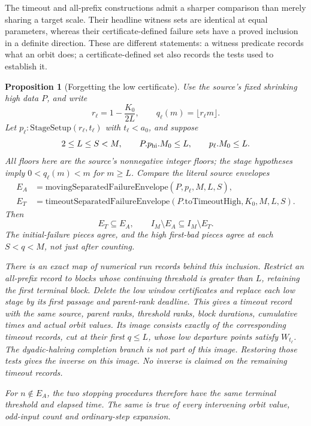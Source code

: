 \documentclass[11pt]{article}
\newtheorem{proposition}{Proposition}
\theoremstyle{remark}\newtheorem{remark}[proposition]{Remark}
\begin{document}
The timeout and all-prefix constructions admit a sharper comparison than
merely sharing a target scale. Their headline witness sets are identical
at equal parameters, whereas their certificate-defined failure sets have
a proved inclusion in a definite direction. These are different statements:
a witness predicate records what an orbit does; a certificate-defined set
also records the tests used to establish it.

\begin{proposition}[Forgetting the low certificate]
\label{prop:shaik-timeout-forgetting}
Use the source's fixed shrinking high data \(P\), and write
\[
 r_\ell=1-\frac{K_0}{2L},\qquad
 q_\ell(m)=\lfloor r_\ell m\rfloor .
\]
Let \(p_\ell:\mathrm{StageSetup}(r_\ell,t_\ell)\) with
\(t_\ell<a_0\), and suppose
\[
 2\le L\le S<M,\qquad
 P.p_{\rm hi}.M_0\le L,\qquad p_\ell.M_0\le L.
\]
All floors here are the source's nonnegative integer floors; the stage
hypotheses imply \(0<q_\ell(m)<m\) for \(m\ge L\).
Compare the literal source envelopes
\[
 \begin{aligned}
 E_A&=\mathrm{movingSeparatedFailureEnvelope}(P,p_\ell,M,L,S),\\
 E_T&=\mathrm{timeoutSeparatedFailureEnvelope}
                 (P.\mathrm{toTimeoutHigh},K_0,M,L,S).
 \end{aligned}
\]
Then
\begin{equation}\label{eq:shaik-timeout-envelope-inclusion}
 E_T\subseteq E_A,\qquad I_M\setminus E_A\subseteq I_M\setminus E_T.
\end{equation}
The initial-failure pieces agree, and the high first-bad pieces agree
at each \(S<q<M\), not just after counting.

There is an exact map of numerical run records behind this inclusion.
Restrict an all-prefix record to blocks whose continuing threshold is
greater than \(L\), retaining the first terminal block. Delete the low
window certificates and replace each low stage by its first passage and
parent-rank deadline. This gives a timeout record with the same source,
parent ranks, threshold ranks, block durations, cumulative times and
actual orbit values. Its image consists exactly of the corresponding
timeout records, cut at their first \(q\le L\), whose low departure
points satisfy \(W_{t_\ell}\). The dyadic-halving completion branch is
not part of this image.
Restoring those tests gives the inverse on this image. No inverse is
claimed on the remaining timeout records.

For \(n\notin E_A\), the two stopping procedures therefore have the same
terminal threshold and elapsed time. The same is true of every intervening
orbit value, odd-input count and ordinary-step expansion.
\end{proposition}
\end{document}
